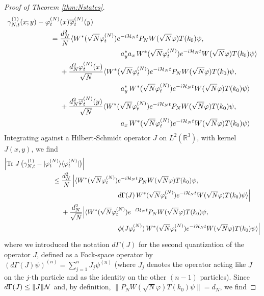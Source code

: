 \documentclass[11pt,a4paper,DIV11]{scrartcl}	%
\newcommand{\bR}{{\mathbb R}}
\newcommand{\tr}{\mbox{Tr}}
\newcommand{\cH}{{\cal H}}
\newcommand{\cN}{{\cal N}}
\begin{document}
\begin{proof}[Proof of Theorem \ref{thm:Nstates}]
\[\begin{split}
 \gamma^{(1)}_{N,t} (x;y)  - \varphi_t^{(N)} &(x) \overline{\varphi}_t^{(N)} (y) \\ = \; &\frac{d_N^2}{N} \langle W^* (\sqrt{N} \varphi^{(N)}_t) e^{-i \cH_N t} P_N W(\sqrt{N} \varphi) T(k_0) \psi ,  \\ & \hspace{3cm} a_y^* a_x \, W^* (\sqrt{N} \varphi^{(N)}_t)  e^{-i \cH_N t} W(\sqrt{N} \varphi) T(k_0) \psi \rangle \\  &+ \frac{d_N^2 \varphi_t^{(N)} (x)}{\sqrt{N}} \langle W^* (\sqrt{N} \varphi^{(N)}_t) e^{-i \cH_N t} P_N W(\sqrt{N} \varphi) T(k_0) \psi ,\\ & \hspace{3cm}  a_y^* \, W^* (\sqrt{N} \varphi^{(N)}_t)  e^{-i \cH_N t} W(\sqrt{N} \varphi) T(k_0) \psi \rangle\\  &+ \frac{d_N^2 \overline{\varphi}_t^{(N)} (y)}{\sqrt{N}} \langle W^* (\sqrt{N} \varphi^{(N)}_t) e^{-i \cH_N t} P_N W(\sqrt{N} \varphi) T(k_0) \psi , \\ & \hspace{3cm}  a_x \, W^* (\sqrt{N} \varphi^{(N)}_t)  e^{-i \cH_N t} W(\sqrt{N} \varphi) T(k_0) \psi \rangle \end{split} \]
 Integrating against a Hilbert-Schmidt operator $J$ on $L^2 (\bR^3)$, with kernel $J (x,y)$, we find
 \[ \begin{split} \Big| \tr \; J  \, \big( \gamma^{(1)}_{N,t} - |\varphi_t^{(N)} \rangle &\langle \varphi^{(N)}_t | \big) \Big| \\ \leq \; & \frac{d_N^2}{N}  \, \Big| \langle W^* (\sqrt{N} \varphi^{(N)}_t) e^{-i \cH_N t} P_N W(\sqrt{N} \varphi) T(k_0) \psi , \\ & \hspace{3cm}  d\Gamma (J) \, W^* (\sqrt{N} \varphi^{(N)}_t)  e^{-i \cH_N t} W(\sqrt{N} \varphi) T(k_0) \psi \rangle \Big| \\
 &+ \frac{d_N^2}{\sqrt{N}} \Big| \langle W^* (\sqrt{N} \varphi^{(N)}_t) e^{-i \cH_N t} P_N W(\sqrt{N} \varphi) T(k_0) \psi ,\\ & \hspace{3cm}  \phi (J \varphi_t^{(N)}) \, W^* (\sqrt{N} \varphi^{(N)}_t)  e^{-i \cH_N t} W(\sqrt{N} \varphi) T(k_0) \psi \rangle \Big| \end{split} \]
 where we introduced the notation $d\Gamma (J)$ for the second quantization of the operator $J$, defined as a Fock-space operator by $(d\Gamma (J) \psi)^{(n)} = \sum_{j=1}^n J_j \psi^{(n)}$ (where $J_j$ denotes the operator acting like $J$ on the $j$-th particle and as the identity on the other $(n-1)$ particles). Since $d\Gamma (J) \leq \| J \| \cN$ and, by definition, $\| P_N W(\sqrt{N} \varphi) T(k_0) \psi \| = d_N$, we find

\end{proof}
\end{document}
